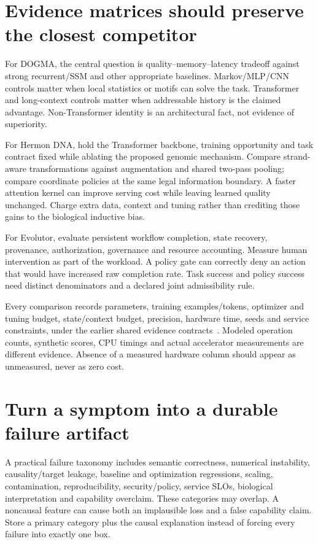 \section{Evidence matrices should preserve the closest competitor}
For DOGMA, the central question is quality--memory--latency tradeoff against
strong recurrent/SSM and other appropriate baselines. Markov/MLP/CNN controls
matter when local statistics or motifs can solve the task. Transformer and
long-context controls matter when addressable history is the claimed advantage.
Non-Transformer identity is an architectural fact, not evidence of superiority.

For Hermon DNA, hold the Transformer backbone, training opportunity and task
contract fixed while ablating the proposed genomic mechanism. Compare
strand-aware transformations against augmentation and shared two-pass pooling;
compare coordinate policies at the same legal information boundary. A faster
attention kernel can improve serving cost while leaving learned quality
unchanged. Charge extra data, context and tuning rather than crediting those
gains to the biological inductive bias.

For Evolutor, evaluate persistent workflow completion, state recovery,
provenance, authorization, governance and resource accounting. Measure human
intervention as part of the workload. A policy gate can correctly deny an action
that would have increased raw completion rate. Task success and policy success
need distinct denominators and a declared joint admissibility rule.

Every comparison records parameters, training examples/tokens, optimizer and
tuning budget, state/context budget, precision, hardware time, seeds and service
constraints, under the earlier shared evidence contracts~\cite{evod52:contracts}.
Modeled operation counts, synthetic scores, CPU timings and actual
accelerator measurements are different evidence. Absence of a measured hardware
column should appear as unmeasured, never as zero cost.

\section{Turn a symptom into a durable failure artifact}
A practical failure taxonomy includes semantic correctness, numerical instability,
causality/target leakage, baseline and optimization regressions, scaling,
contamination, reproducibility, security/policy, service SLOs, biological
interpretation and capability overclaim. These categories may overlap. A
noncausal feature can cause both an implausible loss and a false capability claim.
Store a primary category plus the causal explanation instead of forcing every
failure into exactly one box.

